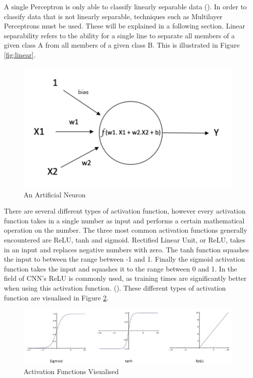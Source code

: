 \documentclass[12pt]{report}
\begin{document}
\begin{flushleft}
A single Perceptron is only able to classify linearly separable data (\cite{kotsiantis2007supervised}). In order to classify data that is not linearly separable, techniques such as Multilayer Perceptrons must be used. These will be explained in a following section. Linear separability refers to the ability for a single line to separate all members of a given class A from all members of a given class B. This is illustrated in Figure \ref{fig:linear}.
\end{flushleft}

\vspace{0.5cm}
\begin{figure}[h]
	\centering
	\includegraphics[width=12cm]{neuron}
	\caption{An Artificial Neuron}
	\label{fig:neuron}
\end{figure}

\begin{flushleft}
There are several different types of activation function, however every activation function takes in a single number as input and performs a certain mathematical operation on the number. The three most common activation functions generally encountered are ReLU, tanh and sigmoid. Rectified Linear Unit, or ReLU, takes in an input and replaces negative numbers with zero. The tanh function squashes the input to between the range between -1 and 1. Finally the sigmoid activation function takes the input and squashes it to the range between 0 and 1. In the field of CNN's ReLU is commonly used, as training times are significantly better when using this activation function. (\cite{krizhevsky2012imagenet}). These different types of activation function are visualised in Figure \ref{fig:functions}.
\end{flushleft}

\vspace{0.5cm}
\begin{figure}[h]
	\centering
	\includegraphics[width=12cm]{functions}
	\caption{Activation Functions Visualised}
	\label{fig:functions}
\end{figure}
\end{document}
